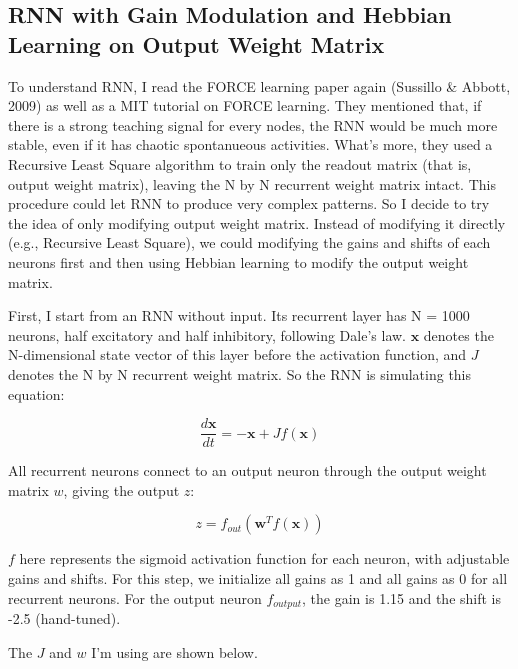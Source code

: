 \documentclass[12pt, a4paper]{article}
\begin{document}
\newpage

\subsection*{RNN with Gain Modulation and Hebbian Learning on Output Weight Matrix}

To understand RNN, I read the FORCE learning paper again (Sussillo \& Abbott, 2009) as well as a MIT tutorial on FORCE learning. They mentioned that, if there is a strong teaching signal for every nodes, the RNN would be much more stable, even if it has chaotic spontanueous activities. What's more, they used a Recursive Least Square algorithm to train only the readout matrix (that is, output weight matrix), leaving the N by N recurrent weight matrix intact. This procedure could let RNN to produce very complex patterns. So I decide to try the idea of only modifying output weight matrix. Instead of modifying it directly (e.g., Recursive Least Square), we could modifying the gains and shifts of each neurons first and then using Hebbian learning to modify the output weight matrix.

First, I start from an RNN without input. Its recurrent layer has N = 1000 neurons, half excitatory and half inhibitory, following Dale's law. $\mathbf{x}$ denotes the N-dimensional state vector of this layer before the activation function, and $J$ denotes the N by N recurrent weight matrix. So the RNN is simulating this equation:

$$\frac{d\mathbf{x}}{dt} = -\mathbf{x} + J f(\mathbf{x}) $$

All recurrent neurons connect to an output neuron through the output weight matrix $w$, giving the output $z$:

$$z = f_{out}(\mathbf{w}^T f(\mathbf{x}))$$

$f$ here represents the sigmoid activation function for each neuron, with adjustable gains and shifts. For this step, we initialize all gains as 1 and all gains as 0 for all recurrent neurons. For the output neuron $f_{output}$, the gain is 1.15 and the shift is -2.5 (hand-tuned).

The $J$ and $w$ I'm using are shown below.
\end{document}
